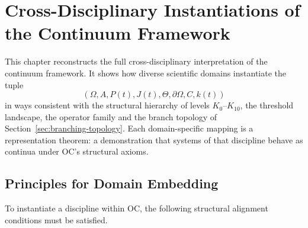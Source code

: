 
\section{Cross-Disciplinary Instantiations of the Continuum Framework}
\label{sec:disciplines-extended}

This chapter reconstructs the full cross-disciplinary interpretation of the
continuum framework. It shows how diverse scientific domains instantiate the
tuple
\[
  (\Omega, A, P(t), J(t), \Theta, \partial\Omega, C, k(t))
\]
in ways consistent with the structural hierarchy of levels
\(K_0\)–\(K_{10}\), the threshold landscape, the operator family and the
branch topology of Section~\ref{sec:branching-topology}.  
Each domain-specific mapping is a representation theorem: a demonstration that
systems of that discipline behave as continua under OC’s structural axioms.

\subsection{Principles for Domain Embedding}

To instantiate a discipline within OC, the following structural alignment
conditions must be satisfied.

